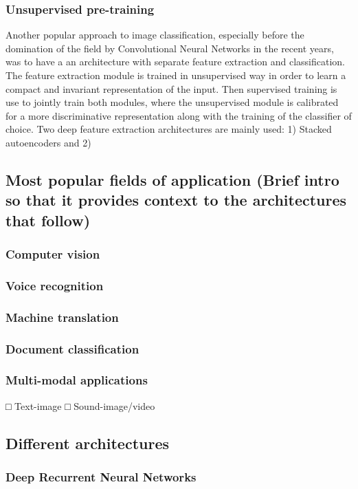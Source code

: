 \documentclass[a4paper]{report}
\begin{document}
		\subsubsection{Unsupervised pre-training}
		Another popular approach to image classification, especially before the domination of the field by Convolutional Neural Networks in the recent years, was to have a an architecture with separate feature extraction and classification. The feature extraction module is trained in unsupervised way in order to learn a compact and invariant representation of the input. Then supervised training is use to jointly train both modules, where the unsupervised module is calibrated for a more discriminative representation along with the training of the classifier of choice. Two deep feature extraction architectures are mainly used: 1) Stacked autoencoders and 2)
		
		
			
	\subsection{Most popular fields of application (Brief intro so that it provides context to the architectures that follow)}
		\subsubsection{Computer vision}
		\subsubsection{Voice recognition}
		\subsubsection{Machine translation}
		\subsubsection{Document classification}
		\subsubsection{Multi-modal applications}
			□ Text-image
			□ Sound-image/video
	\subsection{Different architectures}
		\subsubsection{Deep Recurrent Neural Networks}		
\end{document}
